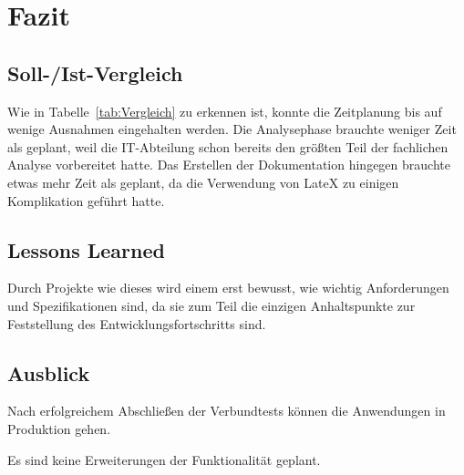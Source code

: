 
\clearpage
\section{Fazit} 
\label{sec:Fazit}

\subsection{Soll-/Ist-Vergleich}
\label{sec:SollIstVergleich}

Wie in Tabelle~\ref{tab:Vergleich} zu erkennen ist, konnte die Zeitplanung bis auf wenige Ausnahmen eingehalten werden. Die Analysephase brauchte weniger Zeit als geplant, weil die IT-Abteilung schon bereits den größten Teil der fachlichen Analyse vorbereitet hatte. Das Erstellen der Dokumentation hingegen brauchte etwas mehr Zeit als geplant, da die Verwendung von LateX zu einigen Komplikation geführt hatte.


\subsection{Lessons Learned}
\label{sec:LessonsLearned}

Durch Projekte wie dieses wird einem erst bewusst, wie wichtig Anforderungen und Spezifikationen sind, da sie zum Teil die einzigen Anhaltspunkte zur Feststellung des Entwicklungsfortschritts sind.

\subsection{Ausblick}
\label{sec:Ausblick}

Nach erfolgreichem Abschließen der Verbundtests können die Anwendungen in Produktion gehen.

Es sind keine Erweiterungen der Funktionalität geplant.
